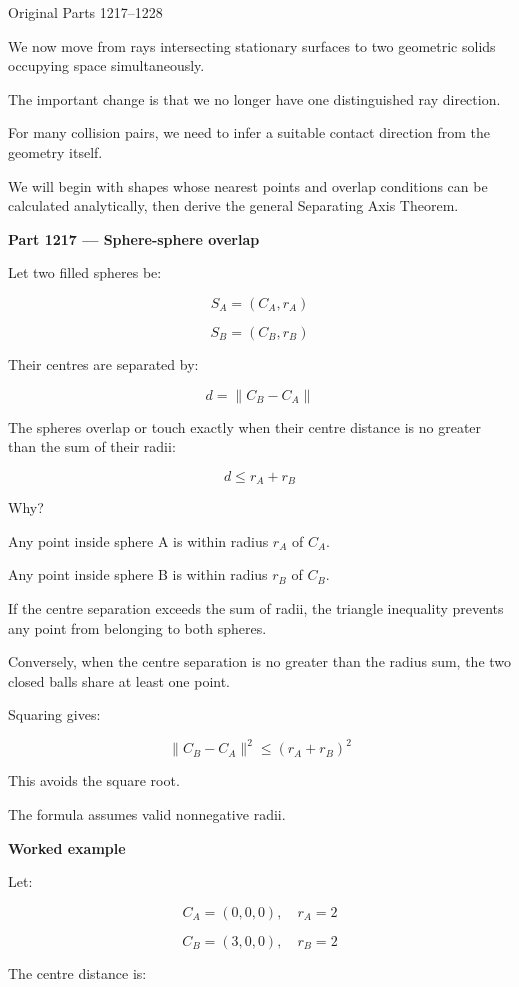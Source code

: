 \hypertarget{04-visual-computing-ii-ch024-part-v-m074-primitive-overlap-and-contact-geometry}{}

Original Parts 1217--1228

We now move from rays intersecting stationary surfaces to two geometric solids occupying space simultaneously.

The important change is that we no longer have one distinguished ray direction.

For many collision pairs, we need to infer a suitable contact direction from the geometry itself.

We will begin with shapes whose nearest points and overlap conditions can be calculated analytically, then derive the general Separating Axis Theorem.

\textbf{Part 1217 --- Sphere-sphere overlap}

Let two filled spheres be:

\[
S_A=(C_A,r_A)
\]

\[
S_B=(C_B,r_B)
\]

Their centres are separated by:

\[
d=\|C_B-C_A\|
\]

The spheres overlap or touch exactly when their centre distance is no greater than the sum of their radii:

\[
\boxed{ d\le r_A+r_B }
\]

Why?

Any point inside sphere A is within radius \(r_A\) of \(C_A\).

Any point inside sphere B is within radius \(r_B\) of \(C_B\).

If the centre separation exceeds the sum of radii, the triangle inequality prevents any point from belonging to both spheres.

Conversely, when the centre separation is no greater than the radius sum, the two closed balls share at least one point.

Squaring gives:

\[
\boxed{ \|C_B-C_A\|^2\le(r_A+r_B)^2 }
\]

This avoids the square root.

The formula assumes valid nonnegative radii.

\textbf{Worked example}

Let:

\[
C_A=(0,0,0),\quad r_A=2
\]

\[
C_B=(3,0,0),\quad r_B=2
\]

The centre distance is:

